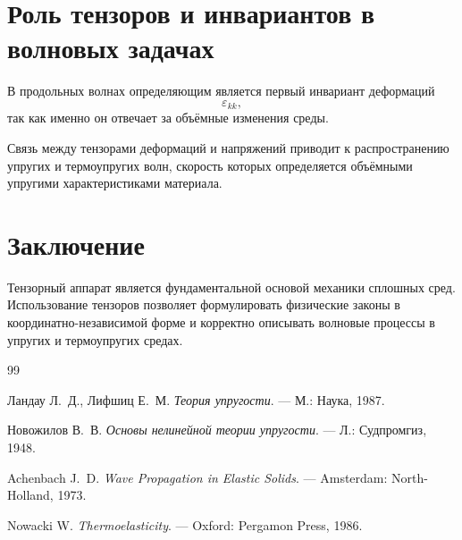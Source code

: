\section{Роль тензоров и инвариантов в волновых задачах}

В продольных волнах
определяющим является первый инвариант деформаций
\begin{equation}
\varepsilon_{kk},
\end{equation}
так как именно он отвечает за объёмные изменения среды.

Связь между тензорами деформаций и напряжений
приводит к распространению упругих и термоупругих волн,
скорость которых определяется
объёмными упругими характеристиками материала.

\section{Заключение}

Тензорный аппарат является фундаментальной основой
механики сплошных сред.
Использование тензоров позволяет
формулировать физические законы
в координатно-независимой форме
и корректно описывать волновые процессы
в упругих и термоупругих средах.

\begin{thebibliography}{99}

Ландау Л.~Д., Лифшиц Е.~М.
\textit{Теория упругости}.
— М.: Наука, 1987.

Новожилов В.~В.
\textit{Основы нелинейной теории упругости}.
— Л.: Судпромгиз, 1948.

Achenbach J.~D.
\textit{Wave Propagation in Elastic Solids}.
— Amsterdam: North-Holland, 1973.

Nowacki W.
\textit{Thermoelasticity}.
— Oxford: Pergamon Press, 1986.

\end{thebibliography}


